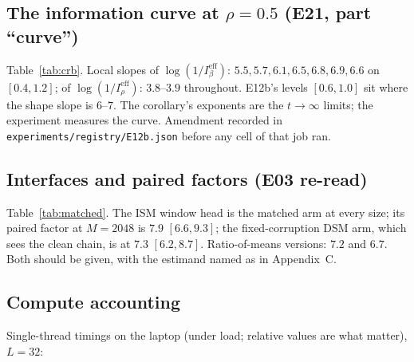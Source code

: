 \subsection{The information curve at $\rho=0.5$ (E21, part ``curve'')}
\label{sec:e21}
Table~\ref{tab:crb}. Local slopes of $\log(1/I^{\mathrm{eff}}_\beta)$: $5.5, 5.7, 6.1, 6.5, 6.8, 6.9, 6.6$ on $[0.4,1.2]$; of $\log(1/I^{\mathrm{eff}}_\rho)$: $3.8$--$3.9$ throughout. E12b's levels $[0.6,1.0]$ sit where the shape slope is $6$--$7$. The corollary's exponents are the $t\to\infty$ limits; the experiment measures the curve. Amendment recorded in \texttt{experiments/registry/E12b.json} before any cell of that job ran.

\subsection{Interfaces and paired factors (E03 re-read)}
Table~\ref{tab:matched}. The ISM window head is the matched arm at every size; its paired factor at $M=2048$ is $7.9$ $[6.6,9.3]$; the fixed-corruption DSM arm, which sees the clean chain, is at $7.3$ $[6.2,8.7]$. Ratio-of-means versions: $7.2$ and $6.7$. Both should be given, with the estimand named as in Appendix~C.

\subsection{Compute accounting}
Single-thread timings on the laptop (under load; relative values are what matter), $L=32$:

